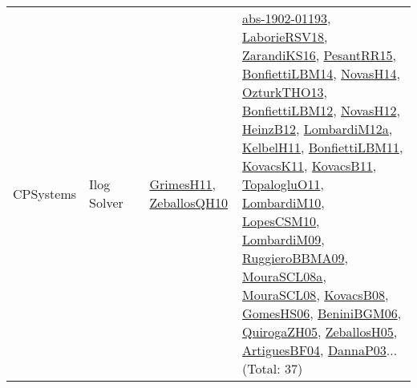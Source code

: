 {\begin{longtable}{lp{3cm}>{\raggedright}p{6cm}>{\raggedright}p{6cm}p{8cm}}
CPSystems & Ilog Solver &  & \href{papers/GrimesH11.pdf}{GrimesH11}\cite{GrimesH11}, \href{articles/ZeballosQH10.pdf}{ZeballosQH10}\cite{ZeballosQH10} & \href{articles/abs-1902-01193.pdf}{abs-1902-01193}\cite{abs-1902-01193}, \href{articles/LaborieRSV18.pdf}{LaborieRSV18}\cite{LaborieRSV18}, \href{articles/ZarandiKS16.pdf}{ZarandiKS16}\cite{ZarandiKS16}, \href{papers/PesantRR15.pdf}{PesantRR15}\cite{PesantRR15}, \href{articles/BonfiettiLBM14.pdf}{BonfiettiLBM14}\cite{BonfiettiLBM14}, \href{articles/NovasH14.pdf}{NovasH14}\cite{NovasH14}, \href{articles/OzturkTHO13.pdf}{OzturkTHO13}\cite{OzturkTHO13}, \href{papers/BonfiettiLBM12.pdf}{BonfiettiLBM12}\cite{BonfiettiLBM12}, \href{articles/NovasH12.pdf}{NovasH12}\cite{NovasH12}, \href{papers/HeinzB12.pdf}{HeinzB12}\cite{HeinzB12}, \href{articles/LombardiM12a.pdf}{LombardiM12a}\cite{LombardiM12a}, \href{articles/KelbelH11.pdf}{KelbelH11}\cite{KelbelH11}, \href{papers/BonfiettiLBM11.pdf}{BonfiettiLBM11}\cite{BonfiettiLBM11}, \href{articles/KovacsK11.pdf}{KovacsK11}\cite{KovacsK11}, \href{articles/KovacsB11.pdf}{KovacsB11}\cite{KovacsB11}, \href{articles/TopalogluO11.pdf}{TopalogluO11}\cite{TopalogluO11}, \href{papers/LombardiM10.pdf}{LombardiM10}\cite{LombardiM10}, \href{articles/LopesCSM10.pdf}{LopesCSM10}\cite{LopesCSM10}, \href{papers/LombardiM09.pdf}{LombardiM09}\cite{LombardiM09}, \href{articles/RuggieroBBMA09.pdf}{RuggieroBBMA09}\cite{RuggieroBBMA09}, \href{papers/MouraSCL08a.pdf}{MouraSCL08a}\cite{MouraSCL08a}, \href{papers/MouraSCL08.pdf}{MouraSCL08}\cite{MouraSCL08}, \href{articles/KovacsB08.pdf}{KovacsB08}\cite{KovacsB08}, \href{papers/GomesHS06.pdf}{GomesHS06}\cite{GomesHS06}, \href{papers/BeniniBGM06.pdf}{BeniniBGM06}\cite{BeniniBGM06}, \href{papers/QuirogaZH05.pdf}{QuirogaZH05}\cite{QuirogaZH05}, \href{articles/ZeballosH05.pdf}{ZeballosH05}\cite{ZeballosH05}, \href{papers/ArtiguesBF04.pdf}{ArtiguesBF04}\cite{ArtiguesBF04}, \href{papers/DannaP03.pdf}{DannaP03}\cite{DannaP03}... (Total: 37)\\

\end{longtable}}

